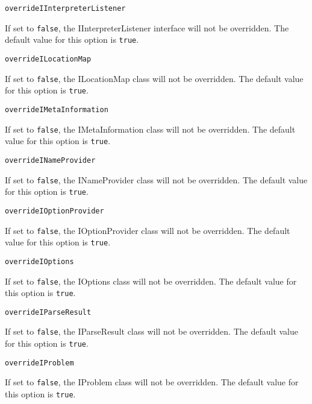 \noindent\texttt{overrideIInterpreterListener}
\begin{myindentpar}{1cm}
If set to \texttt{false}, the IInterpreterListener interface will not be overridden. The default value for this option is \texttt{true}.
\end{myindentpar}

\noindent\texttt{overrideILocationMap}
\begin{myindentpar}{1cm}
If set to \texttt{false}, the ILocationMap class will not be overridden. The default value for this option is \texttt{true}.
\end{myindentpar}

\noindent\texttt{overrideIMetaInformation}
\begin{myindentpar}{1cm}
If set to \texttt{false}, the IMetaInformation class will not be overridden. The default value for this option is \texttt{true}.
\end{myindentpar}

\noindent\texttt{overrideINameProvider}
\begin{myindentpar}{1cm}
If set to \texttt{false}, the INameProvider class will not be overridden. The default value for this option is \texttt{true}.
\end{myindentpar}

\noindent\texttt{overrideIOptionProvider}
\begin{myindentpar}{1cm}
If set to \texttt{false}, the IOptionProvider class will not be overridden. The default value for this option is \texttt{true}.
\end{myindentpar}

\noindent\texttt{overrideIOptions}
\begin{myindentpar}{1cm}
If set to \texttt{false}, the IOptions class will not be overridden. The default value for this option is \texttt{true}.
\end{myindentpar}

\noindent\texttt{overrideIParseResult}
\begin{myindentpar}{1cm}
If set to \texttt{false}, the IParseResult class will not be overridden. The default value for this option is \texttt{true}.
\end{myindentpar}

\noindent\texttt{overrideIProblem}
\begin{myindentpar}{1cm}
If set to \texttt{false}, the IProblem class will not be overridden. The default value for this option is \texttt{true}.
\end{myindentpar}

